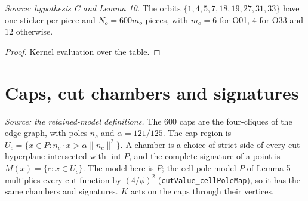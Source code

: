 \begin{lemma}
  \label{lem:selected-census}
  \leanok
  \textit{Source: hypothesis C and Lemma 10.}
  The orbits \(\{1,4,5,7,18,19,27,31,33\}\) have one sticker per piece and
  \(N_o=600m_o\) pieces, with \(m_o=6\) for O01, \(4\) for O33 and \(12\)
  otherwise.
\end{lemma}
\begin{proof}
  \leanok
  Kernel evaluation over the table.
\end{proof}

\section{Caps, cut chambers and signatures}

\begin{definition}
  \label{def:cut-chambers}
  \leanok
  \textit{Source: the retained-model definitions.}
  The \(600\) caps are the four-cliques of the edge graph, with poles
  \(n_c\) and \(\alpha=121/125\). The cap region is
  \(U_c=\{x\in P:n_c\cdot x>\alpha\|n_c\|^2\}\). A chamber is a choice of
  strict side of every cut hyperplane intersected with
  \(\operatorname{int}P\), and the complete signature of a point is
  \(M(x)=\{c:x\in U_c\}\). The model here is \(P\); the cell-pole model
  \(\widetilde P\) of Lemma 5 multiplies every cut function by
  \((4/\phi)^2\) (\texttt{cutValue\_cellPoleMap}), so it has the same
  chambers and signatures. \(K\) acts on the caps through their vertices.
\end{definition}

